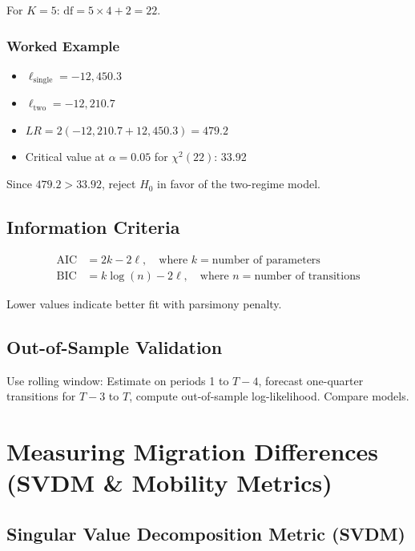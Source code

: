 \documentclass[12pt,a4paper]{article}
\begin{document}
For $K=5$: $\text{df} = 5 \times 4 + 2 = 22$.

\subsubsection*{Worked Example}
\begin{itemize}[noitemsep]
    \item $\ell_{\text{single}} = -12{,}450.3$
    \item $\ell_{\text{two}} = -12{,}210.7$
    \item $LR = 2(-12{,}210.7 + 12{,}450.3) = 479.2$
    \item Critical value at $\alpha=0.05$ for $\chi^2(22)$: 33.92
\end{itemize}

Since $479.2 > 33.92$, reject $H_0$ in favor of the two-regime model.

\subsection{Information Criteria}

\begin{align}
\text{AIC} &= 2k - 2\ell, \quad \text{where } k = \text{number of parameters} \\
\text{BIC} &= k \log(n) - 2\ell, \quad \text{where } n = \text{number of transitions}
\end{align}

Lower values indicate better fit with parsimony penalty.

\subsection{Out-of-Sample Validation}

Use rolling window: Estimate on periods 1 to $T-4$, forecast one-quarter transitions for $T-3$ to $T$, compute out-of-sample log-likelihood. Compare models.

\section{Measuring Migration Differences (SVDM \& Mobility Metrics)}

\subsection{Singular Value Decomposition Metric (SVDM)}
\end{document}
